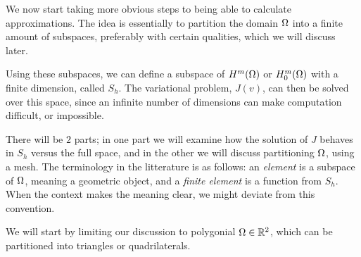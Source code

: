 We now start taking more obvious steps to being able to calculate approximations. 
The idea is essentially to partition the domain $\Omega$ into a finite amount 
of subspaces, preferably with certain qualities, which we will discuss later. 

Using these subspaces, we can define a subspace of $H^m(\Omega)$ or $H^m_0(\Omega)$ 
with a finite dimension, called $S_h$. The variational problem, $J(v)$, can then be 
solved over this space, since an infinite number of dimensions can make 
computation difficult, or impossible.

There will be $2$ parts; in one part we 
will examine how the solution of $J$ behaves in $S_h$ versus the full space, 
and in the other we will discuss partitioning $\Omega$, using a mesh.
The terminology in the litterature is as follows: an \emph{element} is a 
subspace of $\Omega$, meaning a geometric object, and a \emph{finite element} is a 
function from $S_h$. When the context makes the meaning clear, we might deviate from 
this convention.

We will start by limiting our discussion to polygonial $\Omega \in \mathbb{R}^2$, which 
can be partitioned into triangles or quadrilaterals.